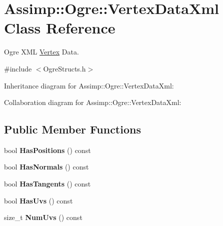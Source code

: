 \hypertarget{class_assimp_1_1_ogre_1_1_vertex_data_xml}{\section{Assimp\+:\+:Ogre\+:\+:Vertex\+Data\+Xml Class Reference}
\label{class_assimp_1_1_ogre_1_1_vertex_data_xml}
}


Ogre X\+M\+L \hyperlink{class_assimp_1_1_vertex}{Vertex} Data.  




{\ttfamily \#include $<$Ogre\+Structs.\+h$>$}



Inheritance diagram for Assimp\+:\+:Ogre\+:\+:Vertex\+Data\+Xml\+:


Collaboration diagram for Assimp\+:\+:Ogre\+:\+:Vertex\+Data\+Xml\+:
\subsection*{Public Member Functions}
\begin{DoxyCompactItemize}
\item 
\hypertarget{class_assimp_1_1_ogre_1_1_vertex_data_xml_a7b41bdcc961d63b115b23ea5d16facdf}{bool {\bfseries Has\+Positions} () const }\label{class_assimp_1_1_ogre_1_1_vertex_data_xml_a7b41bdcc961d63b115b23ea5d16facdf}

\item 
\hypertarget{class_assimp_1_1_ogre_1_1_vertex_data_xml_a63ecc03a403ef8a6ce0c1817a695ec5d}{bool {\bfseries Has\+Normals} () const }\label{class_assimp_1_1_ogre_1_1_vertex_data_xml_a63ecc03a403ef8a6ce0c1817a695ec5d}

\item 
\hypertarget{class_assimp_1_1_ogre_1_1_vertex_data_xml_a15b55fb4480f699f5d616aef6812b923}{bool {\bfseries Has\+Tangents} () const }\label{class_assimp_1_1_ogre_1_1_vertex_data_xml_a15b55fb4480f699f5d616aef6812b923}

\item 
\hypertarget{class_assimp_1_1_ogre_1_1_vertex_data_xml_a86e3717b11ff8f0c74d8b55158bf62a7}{bool {\bfseries Has\+Uvs} () const }\label{class_assimp_1_1_ogre_1_1_vertex_data_xml_a86e3717b11ff8f0c74d8b55158bf62a7}

\item 
\hypertarget{class_assimp_1_1_ogre_1_1_vertex_data_xml_adc0b12ffec89e8902ff521ae2e479f45}{size\+\_\+t {\bfseries Num\+Uvs} () const }\label{class_assimp_1_1_ogre_1_1_vertex_data_xml_adc0b12ffec89e8902ff521ae2e479f45}

\end{DoxyCompactItemize}
